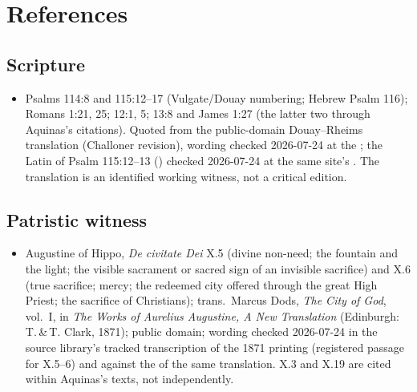 \section{References}

\begingroup
\setlength{\parskip}{0pt}
\titlespacing*{\subsection}{0pt}{1.0ex}{0.3ex}

\subsection*{Scripture}

{\fontsize{8.6}{9.6}\selectfont
\begin{itemize}[itemsep=0pt,parsep=0pt,topsep=0.05em]
\item Psalms 114:8 and 115:12--17 (Vulgate/Douay numbering; Hebrew Psalm 116); Romans 1:21, 25; 12:1, 5; 13:8 and James 1:27 (the latter two through Aquinas's citations). Quoted from the public-domain Douay--Rheims translation (Challoner revision), wording checked 2026-07-24 at the ; the Latin of Psalm 115:12--13 () checked 2026-07-24 at the same site's . The translation is an identified working witness, not a critical edition.
\end{itemize}}

\subsection*{Patristic witness}

{\fontsize{8.6}{9.6}\selectfont
\begin{itemize}[itemsep=0pt,parsep=0pt,topsep=0.05em]
\item Augustine of Hippo, \emph{De civitate Dei} X.5 (divine non-need; the fountain and the light; the visible sacrament or sacred sign of an invisible sacrifice) and X.6 (true sacrifice; mercy; the redeemed city offered through the great High Priest; the sacrifice of Christians); trans.\ Marcus Dods, \emph{The City of God}, vol.~I, in \emph{The Works of Aurelius Augustine, A New Translation} (Edinburgh: T.\,\&\,T. Clark, 1871); public domain; wording checked 2026-07-24 in the source library's tracked transcription of the 1871 printing (registered passage for X.5--6) and against the  of the same translation. X.3 and X.19 are cited within Aquinas's texts, not independently.
\end{itemize}}

